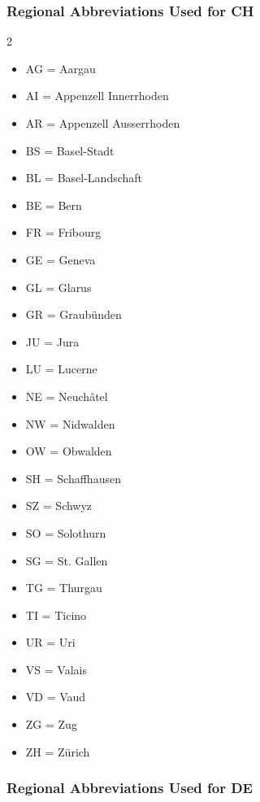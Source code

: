 \documentclass{article}
\begin{document}
\subsubsection{Regional Abbreviations Used for CH}
\begin{multicols}{2}
\begin{itemize}
    \item AG = Aargau
\item AI = Appenzell Innerrhoden
\item AR = Appenzell Ausserrhoden
\item BS = Basel-Stadt
\item BL = Basel-Landschaft
\item BE = Bern
\item FR = Fribourg
\item GE = Geneva
\item GL = Glarus
\item GR = Graubünden
\item JU = Jura
\item LU = Lucerne
\item NE = Neuchâtel
\item NW = Nidwalden
\item OW = Obwalden
\item SH = Schaffhausen
\item SZ = Schwyz
\item SO = Solothurn
\item SG = St. Gallen
\item TG = Thurgau
\item TI = Ticino
\item UR = Uri
\item VS = Valais
\item VD = Vaud
\item ZG = Zug
\item ZH = Zürich
\end{itemize}
\end{multicols}
\subsubsection{Regional Abbreviations Used for DE}
\end{document}
